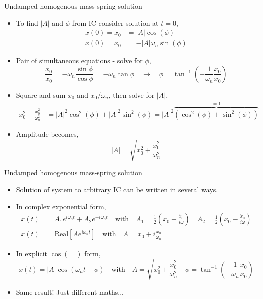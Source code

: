 \documentclass[11pt,aspectratio=169,handout]{beamer}
\begin{document}
\begin{frame}[c]{Undamped homogenous mass-spring solution}
	\begin{itemize}
		\item<1-> To find $|A|$ and $\phi$ from IC consider solution at $t=0$,
	\begin{align}
		x(0) = x_0&= |A|\cos(\phi)\\
		\dot{x}(0) =\dot{x}_0& = -|A|\omega_n\sin(\phi)
	\end{align}
	\item<2-> Pair of simultaneous equations - solve for $\phi$,
	\begin{equation}
		\frac{ \dot{x}_0}{ x_0} = -\omega_n \frac{\sin\phi}{\cos\phi} = -\omega_n \tan\phi \quad \rightarrow \quad \phi = \tan^{-1}\left(-\frac{1}{\omega_n}\frac{\dot{x}_0}{x_0}\right)
	\end{equation}
	\item<3-> Square and sum $x_0$ and $\dot{x}_0/\omega_n$, then solve for $|A|$,
\begin{align}
	x_0^2 + \frac{\dot{x}_0^2}{\omega_n^2}&= |A|^2\cos^2(\phi)+|A|^2\sin^2(\phi) = |A|^2 \overbrace{(\cos^2(\phi)+\sin^2(\phi))}^{=1}
\end{align}
\item<3-> Amplitude becomes, 
\begin{equation}
	|A| = \sqrt{x_0^2 + \frac{\dot{x}_0^2}{\omega_n^2}}
\end{equation}
\end{itemize}
\end{frame}

\begin{frame}[c]{Undamped homogenous mass-spring solution}
	\begin{itemize}
		\item<1-> Solution of system to arbitrary IC can be written in several ways. 
		\item<1-> In complex exponential form,
		\begin{align}
			x(t) &= A_1 e^{i\omega_n t} + A_2 e^{-i\omega_n t} \quad \mbox{with} \quad 	A_1 = \frac{1}{2}\left(x_0 +\frac{\dot{x}_0}{i\omega}\right) \quad  A_2 = \frac{1}{2}\left(x_0 -\frac{\dot{x}_0}{i \omega}\right)\\
			x(t) &= \mbox{Real}[Ae^{i\omega_n t}] \quad \mbox{with} \quad A = x_0 + i\frac{\dot{x}_0}{\omega_n}
		\end{align}
	 	\item<2-> In explicit $\cos(\quad)$ form,
		\begin{equation}
			x(t) = |A|\cos(\omega_n t + \phi) \quad \mbox{with} \quad A = \sqrt{x_0^2 + \frac{\dot{x}_0^2}{\omega_n^2}}\quad \phi = \tan^{-1}\left(-\frac{1}{\omega_n}\frac{\dot{x}_0}{x_0}\right)
		\end{equation}
		\item<3-> Same result! Just different maths...
	\end{itemize}
\end{frame}
\end{document}
